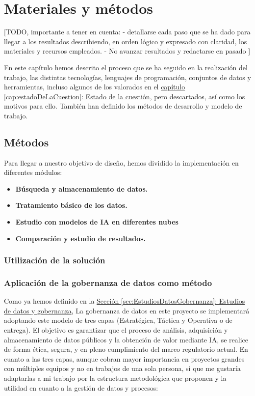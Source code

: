 \chapter{Materiales y métodos}
\label{cap:Materiales y metodos}

[TODO, importante a tener en cuenta:
 -  detallarse cada paso que se ha dado para llegar a los resultados describiendo, en orden lógico y expresado con claridad, los materiales y recursos empleados. 
 - No avanzar resultados y redactarse en pasado
]

En este capítulo hemos descrito el proceso que se ha seguido en la realización del trabajo, las distintas tecnologías, lenguajes de programación, conjuntos de datos y herramientas, incluso algunos de los valorados en el \hyperref[cap:estadoDeLaCuestion]{capítulo \ref*{cap:estadoDeLaCuestion}: Estado de la cuestión}, pero descartados, así como los motivos para ello. También han definido los métodos de desarrollo y modelo de trabajo. \\


\section{Métodos}

Para llegar a nuestro objetivo de diseño, hemos dividido la implementación en diferentes módulos:

\begin{itemize}
	\item \textbf{ Búsqueda y almacenamiento de datos.}
	\item \textbf{ Tratamiento básico de los datos.}
	\item \textbf{ Estudio con modelos de IA en diferentes nubes}
	\item \textbf{ Comparación y estudio de resultados.}
\end{itemize}

\subsection{Utilización de la solución}


\subsection{Aplicación de la gobernanza de datos como método}  \label{sec:Metodos_Gobernanza}

Como ya hemos definido en la \hyperref[sec:EstudiosDatosGobernanza]{Sección \ref*{sec:EstudiosDatosGobernanza}: Estudios de datos y gobernanza}, La gobernanza de datos en este proyecto se implementará adoptando este modelo de tres capas (Estratégica, Táctica y Operativa o de entrega). El objetivo es garantizar que el proceso de análisis, adquisición y almacenamiento de datos públicos y la obtención de valor mediante IA, se realice de forma ética, segura, y en pleno cumplimiento del marco regulatorio actual. En cuanto a las tres capas, aunque cobran mayor importancia en proyectos grandes con múltiples equipos y no en trabajos de una sola persona, si que me gustaría adaptarlas a mi trabajo por la estructura metodológica que proponen y la utilidad en cuanto a la gestión de datos y procesos:

